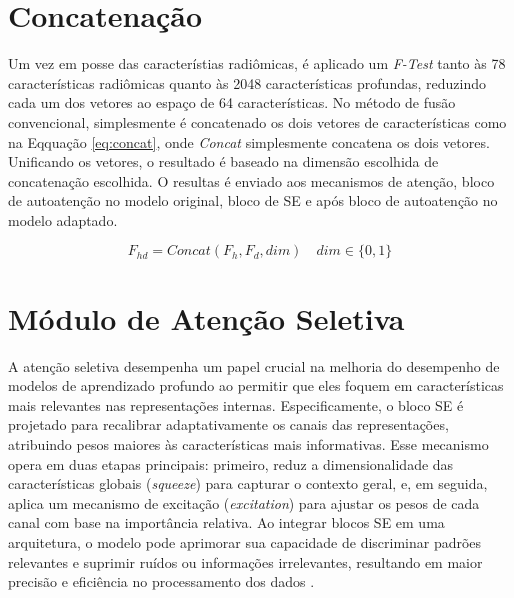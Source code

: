 \section{Concatenação}
\label{subsec:cap4_concatenacao}

Um vez em posse das característias radiômicas, é aplicado um \textit{F-Test} tanto às 78 características radiômicas quanto às 2048 características profundas, reduzindo cada um dos vetores ao espaço de 64 características. No método de fusão convencional, simplesmente é concatenado os dois vetores de características como na Eqquação \ref{eq:concat}, onde \textit{Concat} simplesmente concatena os dois vetores. Unificando os vetores, o resultado é baseado na dimensão escolhida de concatenação escolhida. O resultas é enviado aos mecanismos de atenção, bloco de autoatenção no modelo original, bloco de \gls{SE} e após bloco de autoatenção no modelo adaptado.

\begin{equation}
F_{hd} = \textit{Concat}(F_h, F_d, dim) \quad dim \in \{0,1\}
\label{eq:concat}
\end{equation}

\section{Módulo de Atenção Seletiva}
\label{subsec:cap4_mod_selective_attn}

A atenção seletiva desempenha um papel crucial na melhoria do desempenho de modelos de aprendizado profundo ao permitir que eles foquem em características mais relevantes nas representações internas. Especificamente, o bloco \gls{SE} é projetado para recalibrar adaptativamente os canais das representações, atribuindo pesos maiores às características mais informativas. Esse mecanismo opera em duas etapas principais: primeiro, reduz a dimensionalidade das características globais (\textit{squeeze}) para capturar o contexto geral, e, em seguida, aplica um mecanismo de excitação (\textit{excitation}) para ajustar os pesos de cada canal com base na importância relativa. Ao integrar blocos SE em uma arquitetura, o modelo pode aprimorar sua capacidade de discriminar padrões relevantes e suprimir ruídos ou informações irrelevantes, resultando em maior precisão e eficiência no processamento dos dados \cite{huSqueezeandExcitationNetworks2018}.

